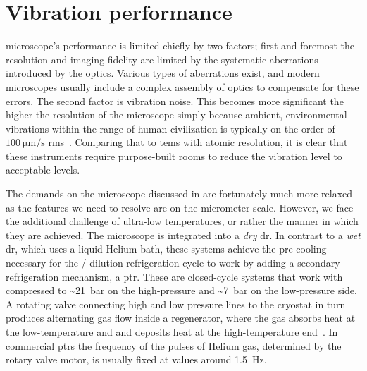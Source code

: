 \chapter{Vibration performance}\label{ch:setup:vibrations}
 microscope's performance is limited chiefly by two factors; first and foremost the resolution and imaging fidelity are limited by the systematic aberrations introduced by the optics.
Various types of aberrations exist, and modern microscopes usually include a complex assembly of optics to compensate for these errors.
The second factor is vibration noise.
This becomes more significant the higher the resolution of the microscope simply because ambient, environmental vibrations within the range of human civilization is typically on the order of $\qty{100}{\micro\meter\per\second}$ \gls{rms}~\cite{Gordon1999}.
Comparing that to \glspl{tem} with atomic resolution, it is clear that these instruments require purpose-built rooms to reduce the vibration level to acceptable levels.

The demands on the microscope discussed in \thethesis are fortunately much more relaxed as the features we need to resolve are on the micrometer scale.
However, we face the additional challenge of ultra-low temperatures, or rather the manner in which they are achieved.
The microscope is integrated into a \emph{dry} \gls{dr}.
In contrast to a \emph{wet} \gls{dr}, which uses a liquid Helium bath, these systems achieve the pre-cooling necessary for the / dilution refrigeration cycle to work by adding a secondary refrigeration mechanism, a \gls{ptr}.
These are closed-cycle systems that work with  compressed to \textasciitilde\qty{21}{\bar} on the high-pressure and \textasciitilde\qty{7}{\bar} on the low-pressure side.
A rotating valve connecting high and low pressure lines to the cryostat in turn produces alternating gas flow inside a regenerator, where the gas absorbs heat at the low-temperature and and deposits heat at the high-temperature end~\cite{Radebaugh2009,DeWaele2011}.
In commercial \glspl{ptr} the frequency of the pulses of Helium gas, determined by the rotary valve motor, is usually fixed at values around \qty{1.5}{\hertz}.

